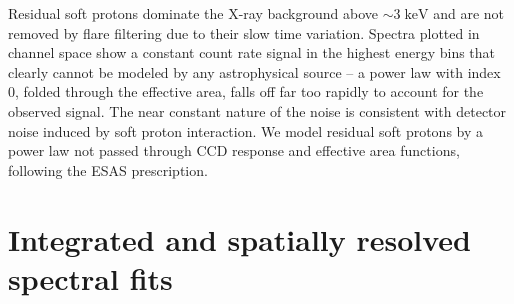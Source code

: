 \documentclass[preprint2,tighten,trackchanges]{aastex6}
\newcommand*{\mt}{\mathrm}
\newcommand*{\unit}[1]{\;\mt{#1}}  %
\newcommand*{\abt}{\mathord{\sim}} %
\begin{document}

Residual soft protons dominate the X-ray background above $\sim 3 \unit{keV}$
and are not removed by flare filtering due to their slow time variation.
Spectra plotted in channel space show a constant count rate signal in the
highest energy bins that clearly cannot be modeled by any astrophysical source
-- a power law with index 0, folded through the effective area, falls off far
too rapidly to account for the observed signal.
The near constant nature of the noise is consistent with detector noise induced
by soft proton interaction.
We model residual soft protons by a power law not passed through CCD response
and effective area functions, following the ESAS prescription.


\section{Integrated and spatially resolved spectral fits} \label{sec:spec}

\begin{figure*}[]
    \label{fig:regs}  %
\end{figure*}
\end{document}
